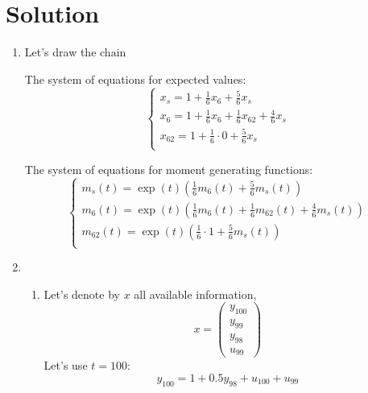 \documentclass[12pt]{article}
\begin{document}
\newpage
\section{Solution}

\begin{enumerate}
\item Let's draw the chain

\begin{center}
\end{center}

The system of equations for expected values:
\[
\begin{cases}
x_s = 1 + \frac{1}{6} x_6 + \frac{5}{6} x_s \\
x_6 = 1 + \frac{1}{6} x_6 + \frac{1}{6} x_{62}  + \frac{4}{6} x_s \\
x_{62} = 1 + \frac{1}{6} \cdot 0  + \frac{5}{6} x_s \\
\end{cases}    
\]


The system of equations for moment generating functions:
\[
\begin{cases}
m_s(t) = \exp(t) \left(\frac{1}{6} m_6(t) + \frac{5}{6} m_s(t)\right) \\
m_6(t) = \exp(t) \left( \frac{1}{6} m_6(t) + \frac{1}{6} m_{62}(t)  + \frac{4}{6} m_s(t)\right) \\
m_{62}(t) = \exp(t) \left( \frac{1}{6} \cdot 1   + \frac{5}{6} m_s(t) \right)\\
\end{cases}    
\]


\item \begin{enumerate}
    \item Let's denote by $x$ all available information, 
    \[
    x = \begin{pmatrix}
        y_{100} \\
        y_{99} \\
        y_{98} \\
        u_{99}
    \end{pmatrix}    
    \]
    Let's use $t=100$:
    \[
    y_{100} = 1 + 0.5 y_{98} + u_{100} + u_{99}    
    \]


\end{enumerate}
\end{enumerate}
\end{document}
